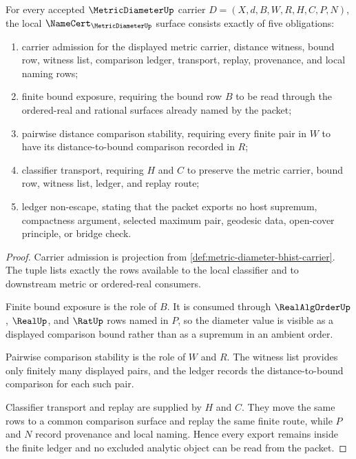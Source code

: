 \begin{theorem}
\label{thm:metric-diameter-namecert-obligation-surface}
For every accepted $\MetricDiameterUp$ carrier $D=(X,d,B,W,R,H,C,P,N)$, the local $\NameCert_{\MetricDiameterUp}$ surface consists exactly of five obligations:
\begin{enumerate}
\item carrier admission for the displayed metric carrier, distance witness, bound row, witness list, comparison ledger, transport, replay, provenance, and local naming rows;
\item finite bound exposure, requiring the bound row $B$ to be read through the ordered-real and rational surfaces already named by the packet;
\item pairwise distance comparison stability, requiring every finite pair in $W$ to have its distance-to-bound comparison recorded in $R$;
\item classifier transport, requiring $H$ and $C$ to preserve the metric carrier, bound row, witness list, ledger, and replay route;
\item ledger non-escape, stating that the packet exports no host supremum, compactness argument, selected maximum pair, geodesic data, open-cover principle, or bridge check.
\end{enumerate}
\end{theorem}
\begin{proof}
Carrier admission is projection from \autoref{def:metric-diameter-bhist-carrier}. The tuple lists exactly the rows available to the local classifier and to downstream metric or ordered-real consumers.

Finite bound exposure is the role of $B$. It is consumed through $\RealAlgOrderUp$, $\RealUp$, and $\RatUp$ rows named in $P$, so the diameter value is visible as a displayed comparison bound rather than as a supremum in an ambient order.

Pairwise comparison stability is the role of $W$ and $R$. The witness list provides only finitely many displayed pairs, and the ledger records the distance-to-bound comparison for each such pair.

Classifier transport and replay are supplied by $H$ and $C$. They move the same rows to a common comparison surface and replay the same finite route, while $P$ and $N$ record provenance and local naming. Hence every export remains inside the finite ledger and no excluded analytic object can be read from the packet.
\end{proof}

